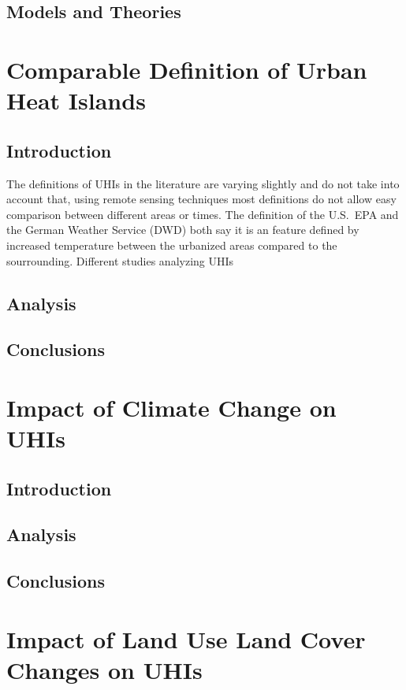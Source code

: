 \documentclass[a4paper, english]{article}
\begin{document}
    
    \subsection{Models and Theories}


\section{Comparable Definition of Urban Heat Islands}
    \subsection{Introduction}
    The definitions of \glspl{UHI} in the literature are varying slightly and do not take into account that, using remote sensing techniques most definitions do not allow easy comparison between different areas or times.
    The definition of the U.S.~EPA\cite{epaUHIDef} and the German Weather Service (DWD) both say it is an feature defined by increased temperature between the urbanized areas compared to the sourrounding. %
    Different studies analyzing \glspl{UHI} 
    \subsection{Analysis}
    
    \subsection{Conclusions}

\section{Impact of Climate Change on UHIs}
    \subsection{Introduction}
    \subsection{Analysis}
    \subsection{Conclusions}

\section{Impact of Land Use Land Cover Changes on UHIs}
\end{document}
